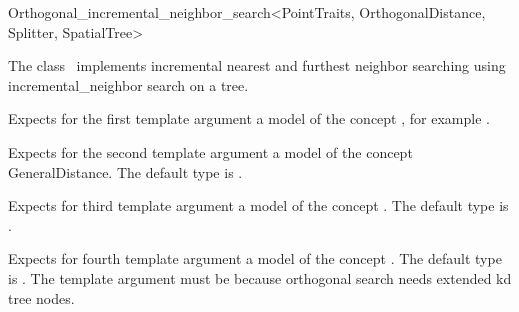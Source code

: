 

\begin{ccRefClass}{Orthogonal_incremental_neighbor_search<PointTraits, OrthogonalDistance, Splitter, SpatialTree>}


\ccDefinition

The class \ccRefName\ implements incremental nearest and furthest neighbor searching
using incremental_neighbor search on a tree.


\ccParameters

Expects for the first template argument a model of the concept ,
for example .

Expects for the second template argument a model of the
concept GeneralDistance. The default type is 
.

Expects for third template argument a model of the concept .
The default type is .

Expects for fourth template argument a model of the concept .
The default type is . The 
template argument must be  because orthogonal search needs extended 
kd tree nodes.

\ccTypes


\ccCreation
{}  %


\end{ccRefClass}
